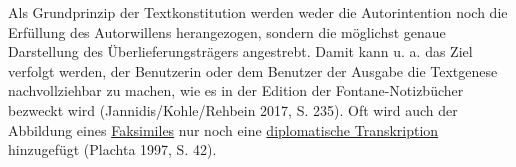 \documentclass{article}
\begin{document}
        Als Grundprinzip der Textkonstitution werden weder die Autorintention noch die
                  Erfüllung des Autorwillens herangezogen, sondern die möglichst genaue Darstellung
                  des Überlieferungsträgers angestrebt. Damit kann u. a. das Ziel verfolgt werden,
                  der Benutzerin oder dem Benutzer der Ausgabe die Textgenese nachvollziehbar zu
                  machen, wie es in der Edition der Fontane-Notizbücher bezweckt wird
                     (Jannidis/Kohle/Rehbein 2017, S. 235). Oft wird auch der Abbildung
                  eines \href{http://gams.uni-graz.at/o:konde.83}{Faksimiles} nur noch eine
                     \href{http://gams.uni-graz.at/o:konde.66}{diplomatische Transkription}
                  hinzugefügt (Plachta 1997, S. 42).\\
            
\end{document}
